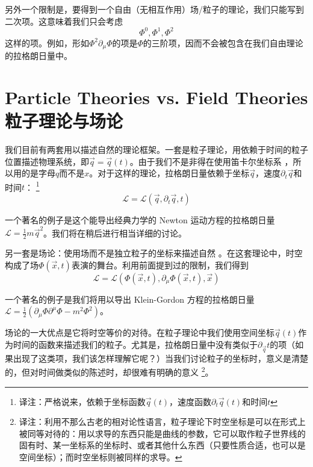 另外一个限制是，要得到一个自由（无相互作用）场/粒子的理论，我们只能写到二次项。这意味着我们只会考虑%
\[
\Phi^0, \Phi^1, \Phi^2
\]
这样的项。例如，形如\(\Phi^2 \partial_\mu \Phi\)的项是\(\Phi\)的三阶项，因而不会被包含在我们自由理论的拉格朗日量中。

\section[粒子理论与场论]{Particle Theories vs. Field Theories \quad 粒子理论与场论}\label{sec4.3}
我们目前有两套用以描述自然的理论框架。一套是粒子理论，用依赖于时间的粒子位置描述物理系统，即\(\vec{q}=\vec{q}(t)\)。由于我们不是非得在使用笛卡尔坐标系%
%
，所以用的是字母\(q\)而不是\(x\)。对于这样的理论，拉格朗日量依赖于坐标\(\vec{q}\)，速度\(\partial_t\vec{q}\)和时间\(t\)：%
\footnote{译注：严格说来，依赖于坐标函数\(\vec{q}(t)\)，速度函数\(\partial_t\vec{q}(t)\)和时间\(t\)}
\begin{equation}
{\mathcal L} = {\mathcal L} (\vec{q},\partial_t\vec{q},t)
\end{equation}

一个著名的例子是这个能导出经典力学的 Newton 运动方程的拉格朗日量\({\mathcal L} = \frac{1}{2}m\vec{q}^2\)。我们将在稍后进行相当详细的讨论。

另一套是场论：使用场而不是独立粒子的坐标来描述自然%
%
。在这套理论中，时空构成了场\(\Phi(\vec{x},t)\)表演的舞台。利用前面提到过的限制，我们得到%
\begin{equation}
{\mathscr L} = {\mathscr L} (\Phi(\vec{x},t), \partial_\mu \Phi(\vec{x},t), \vec{x})
\end{equation}

一个著名的例子是我们将用以导出 Klein-Gordon 方程的拉格朗日量\({\mathscr L} = \frac{1}{2}\left(\partial_\mu\Phi\partial^\mu\Phi-m^2\Phi^2\right)\)。

场论的一大优点是它将时空等价的对待。在粒子理论中我们使用空间坐标\(\vec{q}(t)\)作为时间的函数来描述我们的粒子。尤其是，拉格朗日量中没有类似于\(\partial_{\vec{q}}t\)的项（如果出现了这类项，我们该怎样理解它呢？）当我们讨论粒子的坐标时，意义是清楚的，但对时间做类似的陈述时，却很难有明确的意义%
\footnote{译注：利用不那么古老的相对论性语言，粒子理论下时空坐标是可以在形式上被同等对待的：用以求导的东西只能是曲线的参数，它可以取作粒子世界线的固有时、某一坐标系的坐标时、或者其他什么东西（只要性质合适，也可以是空间坐标）；而时空坐标则被同样的求导。}。

